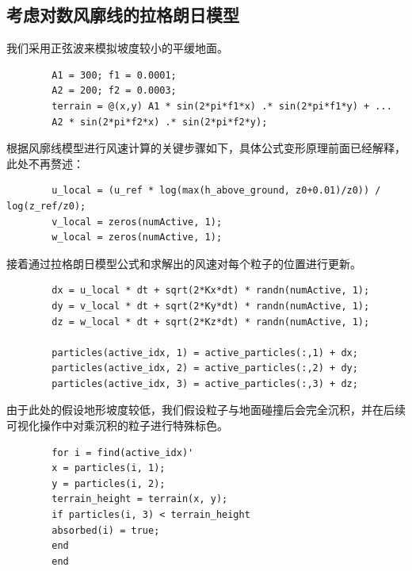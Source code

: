 \documentclass{article}
\begin{document}
	\subsection{考虑对数风廓线的拉格朗日模型}
	我们采用正弦波来模拟坡度较小的平缓地面。
	\begin{lstlisting}
		A1 = 300; f1 = 0.0001;   
		A2 = 200; f2 = 0.0003;  
		terrain = @(x,y) A1 * sin(2*pi*f1*x) .* sin(2*pi*f1*y) + ...
		A2 * sin(2*pi*f2*x) .* sin(2*pi*f2*y);\end{lstlisting}
	\indent 根据风廓线模型进行风速计算的关键步骤如下，具体公式变形原理前面已经解释，此处不再赘述：
	\begin{lstlisting}
		u_local = (u_ref * log(max(h_above_ground, z0+0.01)/z0)) / log(z_ref/z0);
		v_local = zeros(numActive, 1);
		w_local = zeros(numActive, 1);\end{lstlisting}
	\indent 接着通过拉格朗日模型公式和求解出的风速对每个粒子的位置进行更新。
	\begin{lstlisting}
		dx = u_local * dt + sqrt(2*Kx*dt) * randn(numActive, 1);
		dy = v_local * dt + sqrt(2*Ky*dt) * randn(numActive, 1);
		dz = w_local * dt + sqrt(2*Kz*dt) * randn(numActive, 1);
		
		particles(active_idx, 1) = active_particles(:,1) + dx;
		particles(active_idx, 2) = active_particles(:,2) + dy;
		particles(active_idx, 3) = active_particles(:,3) + dz;\end{lstlisting}
	\indent 由于此处的假设地形坡度较低，我们假设粒子与地面碰撞后会完全沉积，并在后续可视化操作中对乘沉积的粒子进行特殊标色。
	\begin{lstlisting}
		for i = find(active_idx)'
		x = particles(i, 1);
		y = particles(i, 2);
		terrain_height = terrain(x, y);
		if particles(i, 3) < terrain_height
		absorbed(i) = true;
		end
		end\end{lstlisting}
\end{document}
